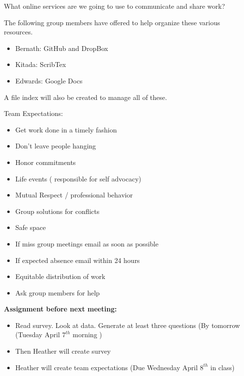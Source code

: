 \documentclass[12pt]{article}
\begin{document}
What online services are we going to use to communicate and share work? 

The following group members have offered to help organize these various resources.
\begin{itemize}
\item Bernath: GitHub and DropBox 
\item Kitada: ScribTex 
\item Edwards: Google Docs 
\end{itemize}

A file index will also be created to manage all of these. 

Team Expectations: 
\begin{itemize}
\item Get work done in a timely fashion 
\item Don't leave people hanging 
\item Honor commitments
\item Life events ( responsible for self advocacy) 
\item Mutual Respect / professional behavior 
\item Group solutions for conflicts
\item Safe space
\item If miss group meetings email as soon as possible 
\item If expected absence email within 24 hours 
\item Equitable distribution of work 
\item Ask group members for help 
\end{itemize}

\textbf{Assignment before next meeting: }
\begin{itemize}
\item Read survey. Look at data. Generate at least three questions (By tomorrow (Tuesday April $7^{th}$ morning )
\item Then Heather will create survey 
\item Heather will create team expectations (Due Wednesday April $8^{th}$ in class)
\end{itemize}







\end{document}
